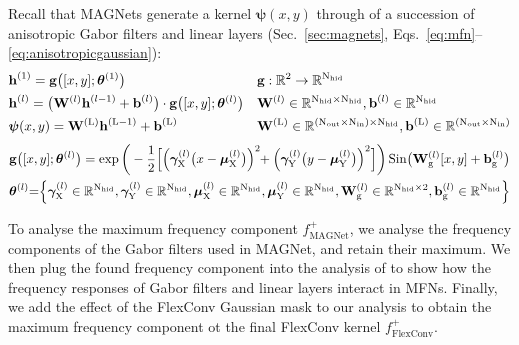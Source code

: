 \documentclass{article} \usepackage{iclr2022_conference,times}
\def\sR{{\mathbb{R}}}
\newcommand{\mat}[1]{\ensuremath{{\mathbf{\MakeUppercase{{#1}}}}}}
\newcommand{\Wm}{\mat{W}}
\def\Nt{\mathrm{N}}
\def\Xt{\mathrm{X}}
\def\Yt{\mathrm{Y}}
\def\sR{{\mathbb{R}}}
\begin{document}
Recall that MAGNets generate a kernel $\boldsymbol{\psi}(x,y)$ through of a succession of anisotropic Gabor filters and linear layers (Sec.~\ref{sec:magnets}, Eqs.~\ref{eq:mfn}--\ref{eq:anisotropicgaussian}):
\begin{align*}
    &\boldsymbol{\mathrm{h}}^{(1)} = \boldsymbol{\mathrm{g}}\big( [x,y]; \boldsymbol{\theta}^{(1)}\big) && \boldsymbol{\mathrm{g}}: \sR^{2} \rightarrow \sR^{\Nt_{\mathrm{hid}}}\\
    &\boldsymbol{\mathrm{h}}^{(l)} = \big(\Wm^{(l)} \boldsymbol{\mathrm{h}}^{(l-1)} + \boldsymbol{\mathrm{b}}^{(l)}\big) \cdot   \boldsymbol{\mathrm{g}}\big( [x,y] ; \boldsymbol{\theta}^{(l)}\big) && \Wm^{(l)} \in \sR^{\Nt_{\mathrm{hid}} \times \Nt_{\mathrm{hid}}}, \boldsymbol{\mathrm{b}}^{(l)} \in \sR^{\Nt_{\mathrm{hid}}} \quad \\
    &\boldsymbol{\psi}(x, y) = \Wm^{(\mathrm{L})} \boldsymbol{\mathrm{h}}^{(\mathrm{L}-1)} + \boldsymbol{\mathrm{b}}^{(\mathrm{L})} && \Wm^{(\mathrm{L})} \in \sR^{(\Nt_{\mathrm{out}} \times \Nt_{\mathrm{in}}) \times \Nt_{\mathrm{hid}}}, \boldsymbol{\mathrm{b}}^{(\mathrm{L})} \in \sR^{(\Nt_{\mathrm{out}} \times \Nt_{\mathrm{in}})}
\end{align*}
\begin{gather*}
    \boldsymbol{\mathrm{g}}\big( [x,y] ; \boldsymbol{\theta}^{(l)}\big) = \exp \bigg(-\frac{1}{2} \Big[\Big(\boldsymbol{\gamma}^{(l)}_\mathrm{X}\big(x - \boldsymbol{\mu}_\mathrm{X}^{(l)}\big)\Big)^2 \hspace{-1mm}+ \Big(\boldsymbol{\gamma}_\mathrm{Y}^{(l)}\big(y - \boldsymbol{\mu}_\mathrm{Y}^{(l)}\big)\Big)^2\Big] \bigg)\, \mathrm{Sin} \big(\Wm_\mathrm{g}^{(l)} [x, y] + \boldsymbol{\mathrm{b}}_\mathrm{g}^{(l)} \big)\\
    \boldsymbol{\theta}^{(l)} {=} \Big\{ \boldsymbol{\gamma}_{\Xt}^{(l)}\in \sR^{\Nt_{\mathrm{hid}}}, \boldsymbol{\gamma}_{\Yt}^{(l)}\in \sR^{\Nt_{\mathrm{hid}}}, \boldsymbol{\mu}_{\Xt}^{(l)}\in \sR^{\Nt_{\mathrm{hid}}}, \boldsymbol{\mu}_{\Yt}^{(l)}\in \sR^{\Nt_{\mathrm{hid}} },\Wm_\mathrm{g}^{(l)}\in \sR^{\Nt_{\mathrm{hid}} \times 2}, \boldsymbol{\mathrm{b}}_\mathrm{g}^{(l)}\in \sR^{\Nt_{\mathrm{hid}}} \Big\}
\end{gather*}

To analyse the maximum frequency component $f^+_{\textrm{MAGNet}}$, we analyse the frequency components of the Gabor filters used in MAGNet, and retain their maximum. We then plug the found frequency component into the analysis of \citet{fathony2021multiplicative} to show how the frequency responses of Gabor filters and linear layers interact in MFNs. Finally, we add the effect of the FlexConv Gaussian mask to our analysis to obtain the maximum frequency component ot the final FlexConv kernel $f^+_{\textrm{FlexConv}}$.
\end{document}
